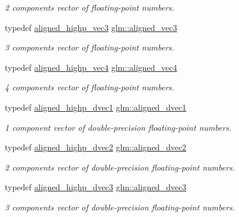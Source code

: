 \begin{DoxyCompactItemize}
\begin{DoxyCompactList}\small\item\em 2 components vector of floating-\/point numbers. \end{DoxyCompactList}\item 
typedef \mbox{\hyperlink{group__gtc__type__aligned_ga69a63faccd6a139ff97748c81a603d50}{aligned\+\_\+highp\+\_\+vec3}} \mbox{\hyperlink{group__gtc__type__aligned_ga9c54536a3becfd10a44f6b1b8c4aa3d3}{glm\+::aligned\+\_\+vec3}}
\begin{DoxyCompactList}\small\item\em 3 components vector of floating-\/point numbers. \end{DoxyCompactList}\item 
typedef \mbox{\hyperlink{group__gtc__type__aligned_ga4ec188da13bf0836f9a61b0b2b88425f}{aligned\+\_\+highp\+\_\+vec4}} \mbox{\hyperlink{group__gtc__type__aligned_gad26d520694d7b865507819c2d9f2b196}{glm\+::aligned\+\_\+vec4}}
\begin{DoxyCompactList}\small\item\em 4 components vector of floating-\/point numbers. \end{DoxyCompactList}\item 
typedef \mbox{\hyperlink{group__gtc__type__aligned_ga14f56809d9577d7f1c3c8fc77651c671}{aligned\+\_\+highp\+\_\+dvec1}} \mbox{\hyperlink{group__gtc__type__aligned_ga81fe4410dc880770293c53fcba83c9e4}{glm\+::aligned\+\_\+dvec1}}
\begin{DoxyCompactList}\small\item\em 1 component vector of double-\/precision floating-\/point numbers. \end{DoxyCompactList}\item 
typedef \mbox{\hyperlink{group__gtc__type__aligned_gaaaaceecde7bb178eebc873836c7e6009}{aligned\+\_\+highp\+\_\+dvec2}} \mbox{\hyperlink{group__gtc__type__aligned_ga1e6972e837bc34b3424af8d63a71d7c6}{glm\+::aligned\+\_\+dvec2}}
\begin{DoxyCompactList}\small\item\em 2 components vector of double-\/precision floating-\/point numbers. \end{DoxyCompactList}\item 
typedef \mbox{\hyperlink{group__gtc__type__aligned_ga8f0cf063fb87e4bd3a26ec242a71d75d}{aligned\+\_\+highp\+\_\+dvec3}} \mbox{\hyperlink{group__gtc__type__aligned_ga82da11893fbac3bda647c9de9da62693}{glm\+::aligned\+\_\+dvec3}}
\begin{DoxyCompactList}\small\item\em 3 components vector of double-\/precision floating-\/point numbers. \end{DoxyCompactList}\item 

\end{DoxyCompactItemize}
